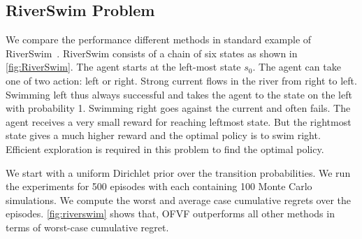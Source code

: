 \documentclass{article}
\theoremstyle{plain}
\theoremstyle{definition}
\begin{document}
\subsection{RiverSwim Problem}


We compare the performance different methods in standard example of RiverSwim~\citep{Osband2013, Strehl2004}. RiverSwim consists of a chain of six states as shown in \cref{fig:RiverSwim}. The agent starts at the left-most state $s_0$. The agent can take one of two action: left or right. Strong current flows in the river from right to left. Swimming left thus always successful and takes the agent to the state on the left with probability 1. Swimming right goes against the current and often fails. The agent receives a very small reward for reaching leftmost state. But the rightmost state gives a much higher reward and the optimal policy is to swim right. Efficient exploration is required in this problem to find the optimal policy.

We start with a uniform Dirichlet prior over the transition probabilities. We run the experiments for 500 episodes with each containing 100 Monte Carlo simulations. We compute the worst and average case cumulative regrets over the episodes. \cref{fig:riverswim} shows that, OFVF outperforms all other methods in terms of worst-case cumulative regret.
\end{document}
